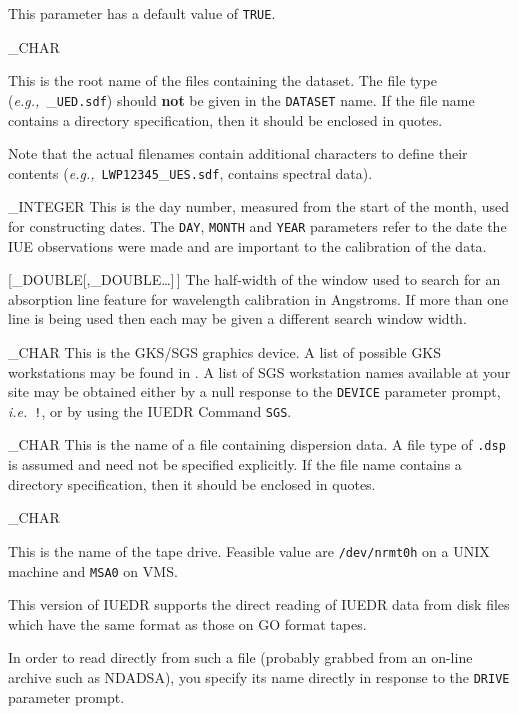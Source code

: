 {{   This parameter has a default value of \verb+TRUE+\@.
}

{
   \_CHAR
}{
   This is the root name of the files containing the dataset.
   The file type ({\it{e.g.,}}\ \_\verb+UED.sdf+) should {\bf not} be given in
   the \verb+DATASET+ name.
   If the file name contains a directory specification, then it
   should be enclosed in quotes.

   Note that the actual filenames contain additional characters
   to define their contents ({\it{e.g.,}}\ \verb+LWP12345+\_\verb+UES.sdf+,
   contains spectral data).
}

{
   \_INTEGER
}{
   This is the day number, measured from the start of the month, used
   for constructing dates.
   The \verb+DAY+, \verb+MONTH+ and \verb+YEAR+ parameters refer to the date
   the IUE observations were made and are important to the calibration of the
   data.
}

{
   [\_DOUBLE[,\_DOUBLE\ldots]\,]
}{
   The half-width of the window used to search for an absorption line feature
   for wavelength calibration in Angstroms.  If more than one line is being
   used then each may be given a different search window width.
}

{
   \_CHAR
}{
   This is the GKS/SGS graphics device.
   A list of possible GKS workstations may be found in
   .
   A list of SGS workstation names available at your
   site may be obtained either by a null response to the \verb+DEVICE+ parameter
   prompt, {\it{i.e.}}\ \verb+!+, or by using the IUEDR Command \verb+SGS+\@.
}

{
   \_CHAR
}{
   This is the name of a file containing dispersion data.
   A file type of \verb+.dsp+ is assumed and need not be specified
   explicitly.
   If the file name contains a directory specification, then it should be
   enclosed in quotes.
}

{
   \_CHAR
}{
   This is the name of the tape drive. Feasible value
   are \verb+/dev/nrmt0h+ on a UNIX machine and \verb+MSA0+ on VMS.

   This version of IUEDR supports the direct reading of
   IUEDR data from disk files which have the same format as those on
   GO format tapes.

   In order to read directly from such a file (probably grabbed from
   an on-line archive such as NDADSA), you specify its name directly in
   response to the \verb+DRIVE+ parameter prompt.

}}
